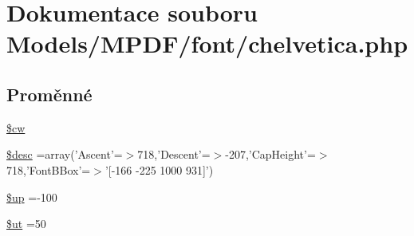 \hypertarget{chelvetica_8php}{\section{Dokumentace souboru Models/\-M\-P\-D\-F/font/chelvetica.php}
\label{chelvetica_8php}
}
\subsection*{Proměnné}
\begin{DoxyCompactItemize}
\item 
\hyperlink{chelvetica_8php_ac2951b03dbb0317e6c61ec920b7479dc}{\$cw}
\item 
\hyperlink{chelvetica_8php_a31059b9e4d0c5af34df20da32232ea9a}{\$desc} =array('Ascent'=$>$718,'Descent'=$>$-\/207,'Cap\-Height'=$>$718,'Font\-B\-Box'=$>$'\mbox{[}-\/166 -\/225 1000 931\mbox{]}')
\item 
\hyperlink{chelvetica_8php_a6b5ad2ac55f9df46e8f34e78fbd6f176}{\$up} =-\/100
\item 
\hyperlink{chelvetica_8php_aadd3f841051043ee58e587e840e8dd0b}{\$ut} =50
\item 

\end{DoxyCompactItemize}
